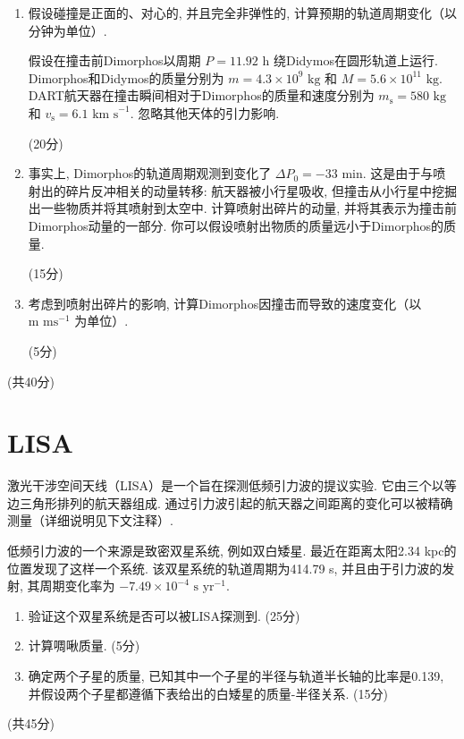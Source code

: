 \documentclass[a4paper,fontset=fandol]{ctexart}
\newcommand{\points}[1]{\par %
	\noindent %
	\hfill (#1分)%
	\vspace{1em}
	}
\begin{document}
	\begin{enumerate}[label=(\alph*)]
		\item 假设碰撞是正面的、对心的, 并且完全非弹性的, 计算预期的轨道周期变化（以分钟为单位）. 
		
		假设在撞击前Dimorphos以周期 \( P = 11.92 \text{ h} \) 绕Didymos在圆形轨道上运行. Dimorphos和Didymos的质量分别为 \(m = 4.3 \times 10^9 \text{ kg}\) 和 \( M = 5.6 \times 10^{11} \text{ kg} \). DART航天器在撞击瞬间相对于Dimorphos的质量和速度分别为 \(m_\mathrm{s} = 580 \text{ kg}\) 和 \( v_\mathrm{s} = 6.1 \text{ km s}^{-1} \). 忽略其他天体的引力影响. \points{20}
		
		\vspace{-1em}
		\item 事实上, Dimorphos的轨道周期观测到变化了 \( \Delta P_0 = -33 \text{ min} \). 这是由于与喷射出的碎片反冲相关的动量转移: 航天器被小行星吸收, 但撞击从小行星中挖掘出一些物质并将其喷射到太空中. 计算喷射出碎片的动量, 并将其表示为撞击前Dimorphos动量的一部分. 你可以假设喷射出物质的质量远小于Dimorphos的质量. \points{15}
		
		\vspace{-1em}
		\item 考虑到喷射出碎片的影响, 计算Dimorphos因撞击而导致的速度变化（以 \( \text{m ms}^{-1} \) 为单位）. \points{5}
	\end{enumerate}
	\vspace{-1em}
	\points{共40}
	
	\section{LISA}
	
	激光干涉空间天线（LISA）是一个旨在探测低频引力波的提议实验. 它由三个以等边三角形排列的航天器组成. 通过引力波引起的航天器之间距离的变化可以被精确测量（详细说明见下文注释）. 
	
	低频引力波的一个来源是致密双星系统, 例如双白矮星. 最近在距离太阳2.34 kpc的位置发现了这样一个系统. 该双星系统的轨道周期为414.79 s, 并且由于引力波的发射, 其周期变化率为 \(-7.49 \times 10^{-4} \text{ s yr}^{-1}\). 
	
	\begin{enumerate}[label=(\alph*)]
		\item 验证这个双星系统是否可以被LISA探测到. \hfill(25分)
		
		\item 计算啁啾质量. \hfill(5分)
		
		\item 确定两个子星的质量, 已知其中一个子星的半径与轨道半长轴的比率是0.139, 并假设两个子星都遵循下表给出的白矮星的质量-半径关系. \hfill(15分)
	\end{enumerate}
	\points{共45}
	
\end{document}
